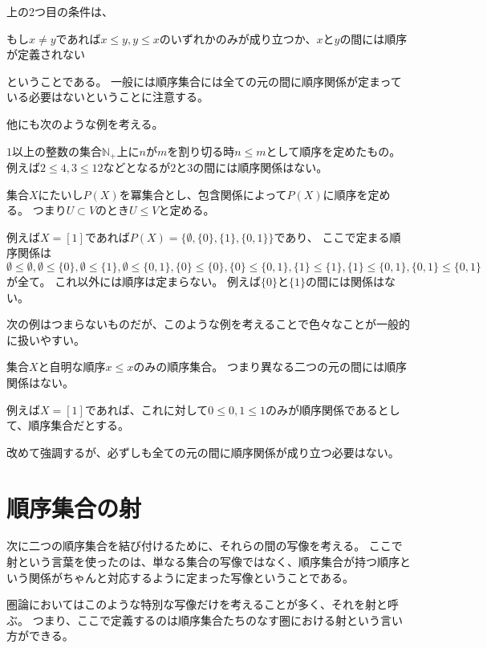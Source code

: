 \documentclass{jsarticle}
\begin{document}
\begin{rem}
上の2つ目の条件は、
\begin{center}
もし$x\neq y$であれば$x\leq y, y\leq x$のいずれかのみが成り立つか、$x$と$y$の間には順序が定義されない
\end{center}
ということである。
一般には順序集合には全ての元の間に順序関係が定まっている必要はないということに注意する。
\end{rem}

他にも次のような例を考える。
\begin{eg}
$1$以上の整数の集合$\mathbb{N}_+$上に$n$が$m$を割り切る時$n\leq m$として順序を定めたもの。
例えば$2\leq 4, 3\leq 12$などとなるが$2$と$3$の間には順序関係はない。
\end{eg}

\begin{eg}
集合$X$にたいし$P(X)$を冪集合とし、包含関係によって$P(X)$に順序を定める。
つまり$U\subset V$のとき$U\leq V$と定める。

例えば$X=[1]$であれば$P(X)=\{\emptyset, \{0\}, \{1\}, \{0,1\}\}$であり、
ここで定まる順序関係は$\emptyset \leq \emptyset, \emptyset \leq \{0\}, \emptyset \leq \{1\}, \emptyset \leq \{0,1\}, \{0\} \leq \{0\}, \{0\} \leq \{0, 1\}, \{1\} \leq \{1\}, \{1\} \leq \{0,1\}, \{0, 1\} \leq \{0, 1\}$が全て。
これ以外には順序は定まらない。
例えば$\{0\}$と$\{1\}$の間には関係はない。
\end{eg}

次の例はつまらないものだが、このような例を考えることで色々なことが一般的に扱いやすい。
\begin{eg}
集合$X$と自明な順序$x\leq x$のみの順序集合。
つまり異なる二つの元の間には順序関係はない。

例えば$X=[1]$であれば、これに対して$0\leq0, 1\leq1$のみが順序関係であるとして、順序集合だとする。
\end{eg}

改めて強調するが、必ずしも全ての元の間に順序関係が成り立つ必要はない。

\section{順序集合の射}
次に二つの順序集合を結び付けるために、それらの間の写像を考える。
ここで射という言葉を使ったのは、単なる集合の写像ではなく、順序集合が持つ順序という関係がちゃんと対応するように定まった写像ということである。

圏論においてはこのような特別な写像だけを考えることが多く、それを射と呼ぶ。
つまり、ここで定義するのは順序集合たちのなす圏における射という言い方ができる。
\end{document}
